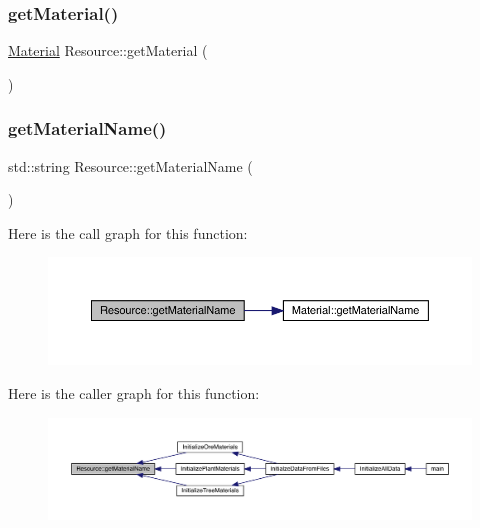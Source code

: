 \mbox{\label{class_resource_a931df727dee149b73f9e10e228e7807a}} 
\subsubsection{\texorpdfstring{get\+Material()}{getMaterial()}}
{\footnotesize\ttfamily \mbox{\hyperlink{class_material}{Material}} Resource\+::get\+Material (\begin{DoxyParamCaption}{ }\end{DoxyParamCaption})}

\mbox{\label{class_resource_acdeb90b10c0e8b2837997525468ab5c3}} 
\subsubsection{\texorpdfstring{get\+Material\+Name()}{getMaterialName()}}
{\footnotesize\ttfamily std\+::string Resource\+::get\+Material\+Name (\begin{DoxyParamCaption}{ }\end{DoxyParamCaption})}

Here is the call graph for this function\+:
\nopagebreak
\begin{figure}[H]
\begin{center}
\leavevmode
\includegraphics[width=350pt]{df/d00/class_resource_acdeb90b10c0e8b2837997525468ab5c3_cgraph}
\end{center}
\end{figure}
Here is the caller graph for this function\+:
\nopagebreak
\begin{figure}[H]
\begin{center}
\leavevmode
\includegraphics[width=350pt]{df/d00/class_resource_acdeb90b10c0e8b2837997525468ab5c3_icgraph}
\end{center}
\end{figure}
\mbox{\label{class_resource_af16ad4255d82bea0bfa2c9ff2faeb596}} 
